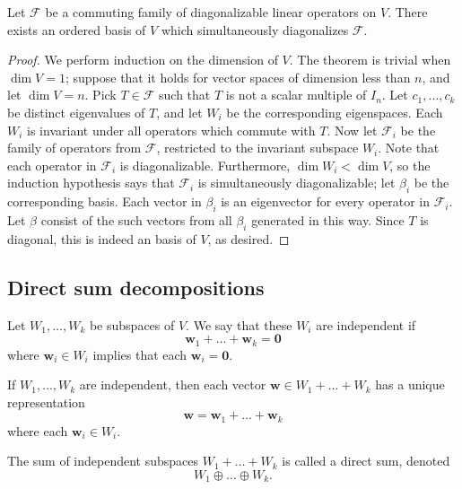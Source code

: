 \documentclass[11pt]{article}
\renewcommand{\vec}[1]{\boldsymbol{#1}}
\newcommand{\vw}{\vec{w}}
\newcommand{\alg}[1]{\mathscr{#1}}
\newcommand{\algF}{\alg{F}}
\theoremstyle{definition}
\theoremstyle{remark}
\numberwithin{equation}{section}
\begin{document}
    \begin{theorem}
        Let $\algF$ be a commuting family of diagonalizable linear operators on $V$.
        There exists an ordered basis of $V$ which simultaneously diagonalizes
        $\algF$.
    \end{theorem}
    \begin{proof}
        We perform induction on the dimension of $V$. The theorem is trivial when
        $\dim{V} = 1$; suppose that it holds for vector spaces of dimension less than
        $n$, and let $\dim{V} = n$. Pick $T \in \algF$ such that $T$ is not a scalar
        multiple of $I_n$. Let $c_1, \dots, c_k$ be distinct eigenvalues of $T$, and
        let $W_i$ be the corresponding eigenspaces. Each $W_i$ is invariant under all
        operators which commute with $T$. Now let $\algF_i$ be the family of
        operators from $\algF$, restricted to the invariant subspace $W_i$. Note that
        each operator in $\algF_i$ is diagonalizable. Furthermore, $\dim{W_i} <
        \dim{V}$, so the induction hypothesis says that $\algF_i$ is simultaneously
        diagonalizable; let $\beta_i$ be the corresponding basis. Each vector in
        $\beta_i$ is an eigenvector for every operator in $\algF_i$. Let $\beta$
        consist of the such vectors from all $\beta_i$ generated in this way. Since
        $T$ is diagonal, this is indeed an basis of $V$, as desired.
    \end{proof}

    \subsection{Direct sum decompositions}
    \begin{definition}
        Let $W_1, \dots, W_k$ be subspaces of $V$. We say that these $W_i$ are
        independent if \[
            \vw_1 + \dots + \vw_k = \vec{0}
        \] where $\vw_i \in W_i$ implies that each $\vw_i = \vec{0}$.
    \end{definition}

    \begin{lemma}
        If $W_1, \dots, W_k$ are independent, then each vector $\vw \in W_1 + ... +
        W_k$ has a unique representation \[
            \vw = \vw_1 + \dots + \vw_k
        \] where each $\vw_i \in W_i$.
    \end{lemma}

    \begin{definition}
        The sum of independent subspaces $W_1 + \dots + W_k$ is called a direct sum,
        denoted \[
            W_1 \oplus \dots \oplus W_k.
        \] 
    \end{definition}
\end{document}
